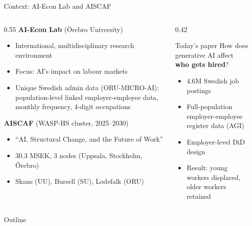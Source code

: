 \documentclass[aspectratio=169,11pt]{beamer}
\begin{document}
\begin{frame}{Context: AI-Econ Lab and AISCAF}
\begin{columns}[T]
\begin{column}{0.55\textwidth}
\textbf{AI-Econ Lab} (Örebro University)
\begin{itemize}
    \item International, multidisciplinary research environment
    \item Focus: AI's impact on labour markets
    \item Unique Swedish admin data (ORU-MICRO-AI): population-level linked employer-employee data, monthly frequency, 4-digit occupations
\end{itemize}
\vspace{3mm}
\textbf{AISCAF} (WASP-HS cluster, 2025--2030)
\begin{itemize}
    \item ``AI, Structural Change, and the Future of Work''
    \item 30.3 MSEK, 3 nodes (Uppsala, Stockholm, Örebro)
    \item Skans (UU), Bursell (SU), Lodefalk (ORU)
\end{itemize}
\end{column}
\begin{column}{0.42\textwidth}
\begin{block}{Today's paper}
How does generative AI affect \textbf{who gets hired}?\\[3mm]
\footnotesize
\begin{itemize}
    \item 4.6M Swedish job postings
    \item Full-population employer-employee register data (AGI)
    \item Employer-level DiD design
    \item Result: young workers displaced, older workers retained
\end{itemize}
\end{block}
\end{column}
\end{columns}
\end{frame}

\begin{frame}{Outline}
\tableofcontents
\end{frame}
\end{document}
